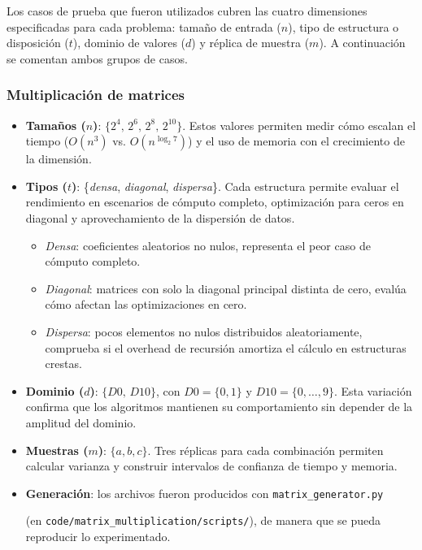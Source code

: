 Los casos de prueba que fueron utilizados cubren las cuatro dimensiones especificadas para cada problema: tamaño de entrada (\(n\)), tipo de estructura o disposición (\(t\)), dominio de valores (\(d\)) y réplica de muestra (\(m\)). A continuación se comentan ambos grupos de casos.

\subsubsection{Multiplicación de matrices}
\begin{itemize}
  \item \textbf{Tamaños (\(n\))}: \(\{2^4,\,2^6,\,2^8,\,2^{10}\}\).  
    Estos valores permiten medir cómo escalan el tiempo (\(O(n^3)\) vs. \(O(n^{\log_2 7})\)) y el uso de memoria con el crecimiento de la dimensión.
  \item \textbf{Tipos (\(t\))}: \{\emph{densa}, \emph{diagonal}, \emph{dispersa}\}.  
    Cada estructura permite evaluar el rendimiento en escenarios de cómputo completo, optimización para ceros en diagonal y aprovechamiento de la dispersión de datos.
    \begin{itemize}
      \item \emph{Densa}: coeficientes aleatorios no nulos, representa el peor caso de cómputo completo.  
      \item \emph{Diagonal}: matrices con solo la diagonal principal distinta de cero, evalúa cómo afectan las optimizaciones en cero.  
      \item \emph{Dispersa}: pocos elementos no nulos distribuidos aleatoriamente, comprueba si el overhead de recursión amortiza el cálculo en estructuras crestas.  
    \end{itemize}
  \item \textbf{Dominio (\(d\))}: \(\{D0,\,D10\}\), con  
    \(D0=\{0,1\}\) y \(D10=\{0,\dots,9\}\).  
    Esta variación confirma que los algoritmos mantienen su comportamiento sin depender de la amplitud del dominio.
  \item \textbf{Muestras (\(m\))}: \(\{a,b,c\}\).  
    Tres réplicas para cada combinación permiten calcular varianza y construir intervalos de confianza de tiempo y memoria.
  \item \textbf{Generación}: los archivos fueron producidos con \texttt{matrix\_generator.py} 
  
  (en \texttt{code/matrix\_multiplication/scripts/}), de manera que se pueda reproducir lo experimentado.
\end{itemize}

